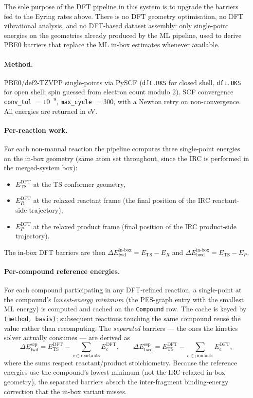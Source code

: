 The sole purpose of the DFT pipeline in this system is to upgrade the barriers fed to the Eyring rates above. There is no DFT geometry optimisation, no DFT vibrational analysis, and no DFT-based dataset assembly: only single-point energies on the geometries already produced by the ML pipeline, used to derive PBE0 barriers that replace the ML in-box estimates whenever available.

\paragraph{Method.}
PBE0/def2-TZVPP single-points via PySCF (\texttt{dft.RKS} for closed shell, \texttt{dft.UKS} for open shell; spin guessed from electron count modulo 2). SCF convergence \texttt{conv\_tol} $= 10^{-9}$, \texttt{max\_cycle} $= 300$, with a Newton retry on non-convergence. All energies are returned in eV.

\paragraph{Per-reaction work.}
For each non-manual reaction the pipeline computes three single-point energies on the in-box geometry (same atom set throughout, since the IRC is performed in the merged-system box):
\begin{itemize}
    \item $E_\text{TS}^\text{DFT}$ at the TS conformer geometry,
    \item $E_R^\text{DFT}$ at the relaxed reactant frame (the final position of the IRC reactant-side trajectory),
    \item $E_P^\text{DFT}$ at the relaxed product frame (final position of the IRC product-side trajectory).
\end{itemize}
The in-box DFT barriers are then $\Delta E_\text{fwd}^\text{in-box} = E_\text{TS} - E_R$ and $\Delta E_\text{bwd}^\text{in-box} = E_\text{TS} - E_P$.

\paragraph{Per-compound reference energies.}
For each compound participating in any DFT-refined reaction, a single-point at the compound's \emph{lowest-energy minimum} (the PES-graph entry with the smallest ML energy) is computed and cached on the \texttt{Compound} row. The cache is keyed by \texttt{(method, basis)}; subsequent reactions touching the same compound reuse the value rather than recomputing. The \emph{separated} barriers --- the ones the kinetics solver actually consumes --- are derived as
\begin{equation}
    \Delta E_\text{fwd}^\text{sep} = E_\text{TS}^\text{DFT} - \!\!\sum_{c \in \text{reactants}}\!\! E_c^\text{DFT}, \qquad
    \Delta E_\text{bwd}^\text{sep} = E_\text{TS}^\text{DFT} - \!\!\sum_{c \in \text{products}}\!\! E_c^\text{DFT},
\end{equation}
where the sums respect reactant/product stoichiometry. Because the reference energies use the compound's lowest minimum (not the IRC-relaxed in-box geometry), the separated barriers absorb the inter-fragment binding-energy correction that the in-box variant misses.

